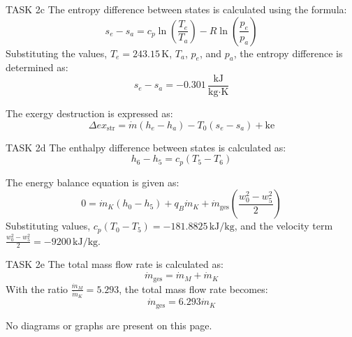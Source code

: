 TASK 2c  
The entropy difference between states is calculated using the formula:  
\[
s_e - s_a = c_p \ln \left( \frac{T_e}{T_a} \right) - R \ln \left( \frac{p_e}{p_a} \right)
\]  
Substituting the values, \( T_e = 243.15 \, \text{K} \), \( T_a \), \( p_e \), and \( p_a \), the entropy difference is determined as:  
\[
s_e - s_a = -0.301 \, \frac{\text{kJ}}{\text{kg·K}}
\]  

The exergy destruction is expressed as:  
\[
\Delta ex_{\text{str}} = \dot{m} \left( h_e - h_a \right) - T_0 \left( s_e - s_a \right) + \text{ke}
\]  

TASK 2d  
The enthalpy difference between states is calculated as:  
\[
h_6 - h_5 = c_p \left( T_5 - T_6 \right)
\]  

The energy balance equation is given as:  
\[
0 = \dot{m}_K \left( h_0 - h_5 \right) + q_B \dot{m}_K + \dot{m}_{\text{ges}} \left( \frac{w_0^2 - w_5^2}{2} \right)
\]  
Substituting values, \( c_p \left( T_0 - T_5 \right) = -181.8825 \, \text{kJ/kg} \), and the velocity term \( \frac{w_0^2 - w_5^2}{2} = -9200 \, \text{kJ/kg} \).  

TASK 2e  
The total mass flow rate is calculated as:  
\[
\dot{m}_{\text{ges}} = \dot{m}_M + \dot{m}_K
\]  
With the ratio \( \frac{\dot{m}_M}{\dot{m}_K} = 5.293 \), the total mass flow rate becomes:  
\[
\dot{m}_{\text{ges}} = 6.293 \dot{m}_K
\]  

No diagrams or graphs are present on this page.